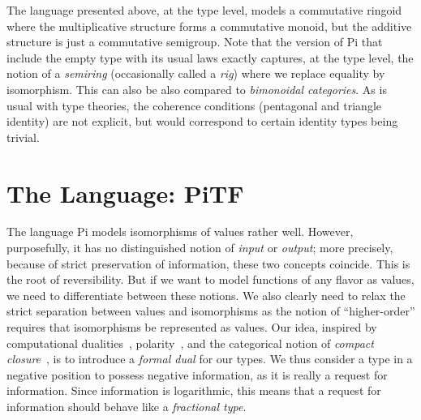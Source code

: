 \documentclass{llncs}
\newcommand{\jacques}[1]{\textsc{Jacques says:} #1}
\begin{document}

The language presented above, at the type level, models a commutative ringoid
where the multiplicative structure forms a commutative monoid, but the
additive structure is just a commutative semigroup.  Note that the version of
{{Pi}} that include the empty type with its usual laws exactly captures, at
the type level, the notion of a \emph{semiring} (occasionally called a
\emph{rig}) where we replace equality by isomorphism.  This can also be also
compared to \emph{bimonoidal categories}.  As is usual with type theories,
the coherence conditions (pentagonal and triangle identity) are not explicit,
but would correspond to certain identity types being trivial.

\section{The Language: {{PiTF}} }

The language {{Pi}} models isomorphisms of values rather well.  However,
purposefully, it has no distinguished notion of \emph{input} or
\emph{output}; more precisely, because of strict preservation of information,
these two concepts coincide.  This is the root of reversibility. But if we
want to model functions of any flavor as values, we need to differentiate
between these notions. We also clearly need to relax the strict separation
between values and isomorphisms as the notion of ``higher-order'' requires
that isomorphisms be represented as values. Our idea, inspired by
computational dualities~\cite{Filinski:1989:DCI:648332.755574,Curien:2000},
polarity~\cite{Girard87tcs,10.1109/LICS.2010.23}, and the categorical notion
of \emph{compact
  closure}~\cite{Selinger:2007:DCC:1229185.1229207,Abramsky:2004:CSQ:1018438.1021878},
is to introduce a \emph{formal dual} for our types.  We thus consider a type
in a negative position to possess negative information, as it is really a
request for information.  Since information is logarithmic, this means that a
request for information should behave like a \emph{fractional type}.
\end{document}
